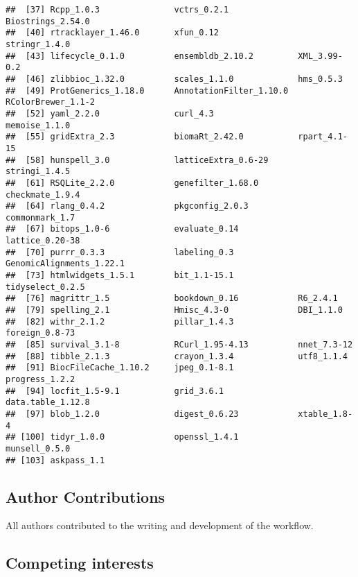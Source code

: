 \documentclass[
]{article}
\begin{document}
\begin{verbatim}
##  [37] Rcpp_1.0.3               vctrs_0.2.1              Biostrings_2.54.0       
##  [40] rtracklayer_1.46.0       xfun_0.12                stringr_1.4.0           
##  [43] lifecycle_0.1.0          ensembldb_2.10.2         XML_3.99-0.2            
##  [46] zlibbioc_1.32.0          scales_1.1.0             hms_0.5.3               
##  [49] ProtGenerics_1.18.0      AnnotationFilter_1.10.0  RColorBrewer_1.1-2      
##  [52] yaml_2.2.0               curl_4.3                 memoise_1.1.0           
##  [55] gridExtra_2.3            biomaRt_2.42.0           rpart_4.1-15            
##  [58] hunspell_3.0             latticeExtra_0.6-29      stringi_1.4.5           
##  [61] RSQLite_2.2.0            genefilter_1.68.0        checkmate_1.9.4         
##  [64] rlang_0.4.2              pkgconfig_2.0.3          commonmark_1.7          
##  [67] bitops_1.0-6             evaluate_0.14            lattice_0.20-38         
##  [70] purrr_0.3.3              labeling_0.3             GenomicAlignments_1.22.1
##  [73] htmlwidgets_1.5.1        bit_1.1-15.1             tidyselect_0.2.5        
##  [76] magrittr_1.5             bookdown_0.16            R6_2.4.1                
##  [79] spelling_2.1             Hmisc_4.3-0              DBI_1.1.0               
##  [82] withr_2.1.2              pillar_1.4.3             foreign_0.8-73          
##  [85] survival_3.1-8           RCurl_1.95-4.13          nnet_7.3-12             
##  [88] tibble_2.1.3             crayon_1.3.4             utf8_1.1.4              
##  [91] BiocFileCache_1.10.2     jpeg_0.1-8.1             progress_1.2.2          
##  [94] locfit_1.5-9.1           grid_3.6.1               data.table_1.12.8       
##  [97] blob_1.2.0               digest_0.6.23            xtable_1.8-4            
## [100] tidyr_1.0.0              openssl_1.4.1            munsell_0.5.0           
## [103] askpass_1.1
\end{verbatim}

\hypertarget{author-contributions}{%
\subsection{Author Contributions}\label{author-contributions}}

All authors contributed to the writing and development of the workflow.

\hypertarget{competing-interests}{%
\subsection{Competing interests}\label{competing-interests}}
\end{document}
